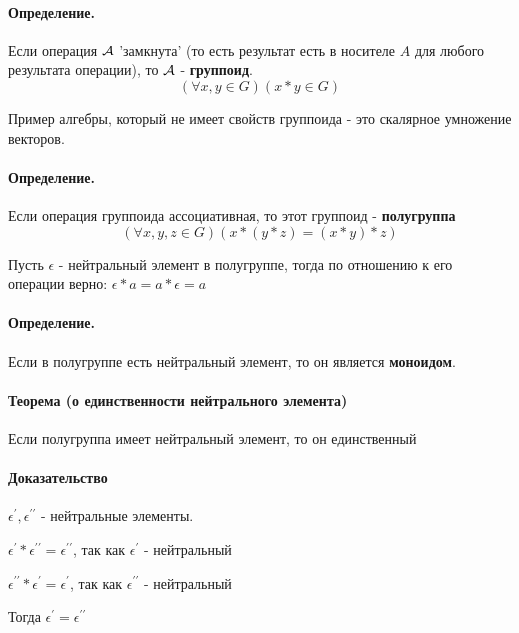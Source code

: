 \documentclass{report}
\begin{document}
\paragraph*{Определение.}
Если операция $\cal A$ 'замкнута' (то есть результат есть в носителе $A$ для любого результата
операции), то $\cal A$ - \textbf{группоид}.
\[
	(\forall x,y \in G)(x * y \in G)
\] 


\medskip

Пример алгебры, который не имеет свойств группоида - это скалярное умножение векторов.

\medskip

\paragraph*{Определение.}
Если операция группоида ассоциативная, то этот группоид - \textbf{полугруппа}
\[
	(\forall x,y,z \in G)(x*(y*z) = (x*y)*z)
\] 


\medskip

Пусть $\epsilon$ - нейтральный элемент в полугруппе,
тогда по отношению к его операции верно:
$\epsilon * a = a * \epsilon = a$

\paragraph*{Определение.}
Если в полугруппе есть нейтральный элемент, то он является \textbf{моноидом}.

\medskip

\paragraph*{Теорема (о единственности нейтрального элемента)}
Если полугруппа имеет нейтральный элемент, то он единственный
\paragraph*{Доказательство}
$\epsilon^{\prime}, \epsilon^{\prime\prime}$ - нейтральные элементы.

$\epsilon^{\prime} * \epsilon^{\prime\prime} = \epsilon^{\prime\prime}$, так как $\epsilon^{\prime}$ - нейтральный

$\epsilon^{\prime\prime} * \epsilon^{\prime} = \epsilon^{\prime}$, так как $\epsilon^{\prime\prime}$ - нейтральный

Тогда $\epsilon^{\prime} = \epsilon^{\prime\prime}$

\medskip
\end{document}
